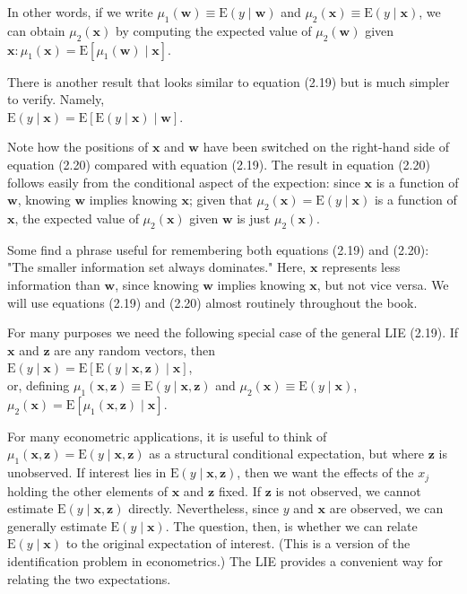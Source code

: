 \documentclass[10pt]{article}
\begin{document}
In other words, if we write $\mu_{1}(\mathbf{w}) \equiv \mathrm{E}(y \mid \mathbf{w})$ and $\mu_{2}(\mathbf{x}) \equiv \mathrm{E}(y \mid \mathbf{x})$, we can obtain $\mu_{2}(\mathbf{x})$ by computing the expected value of $\mu_{2}(\mathbf{w})$ given $\mathbf{x}: \mu_{1}(\mathbf{x})=\mathrm{E}\left[\mu_{1}(\mathbf{w}) \mid \mathbf{x}\right]$.

There is another result that looks similar to equation (2.19) but is much simpler to verify. Namely,\\
$\mathrm{E}(y \mid \mathbf{x})=\mathrm{E}[\mathrm{E}(y \mid \mathbf{x}) \mid \mathbf{w}]$.

Note how the positions of $\mathbf{x}$ and $\mathbf{w}$ have been switched on the right-hand side of equation (2.20) compared with equation (2.19). The result in equation (2.20) follows easily from the conditional aspect of the expection: since $\mathbf{x}$ is a function of $\mathbf{w}$, knowing $\mathbf{w}$ implies knowing $\mathbf{x}$; given that $\mu_{2}(\mathbf{x})=\mathrm{E}(y \mid \mathbf{x})$ is a function of $\mathbf{x}$, the expected value of $\mu_{2}(\mathbf{x})$ given $\mathbf{w}$ is just $\mu_{2}(\mathbf{x})$.

Some find a phrase useful for remembering both equations (2.19) and (2.20): "The smaller information set always dominates." Here, $\mathbf{x}$ represents less information than $\mathbf{w}$, since knowing $\mathbf{w}$ implies knowing $\mathbf{x}$, but not vice versa. We will use equations (2.19) and (2.20) almost routinely throughout the book.

For many purposes we need the following special case of the general LIE (2.19). If $\mathbf{x}$ and $\mathbf{z}$ are any random vectors, then\\
$\mathrm{E}(y \mid \mathbf{x})=\mathrm{E}[\mathrm{E}(y \mid \mathbf{x}, \mathbf{z}) \mid \mathbf{x}]$,\\
or, defining $\mu_{1}(\mathbf{x}, \mathbf{z}) \equiv \mathrm{E}(y \mid \mathbf{x}, \mathbf{z})$ and $\mu_{2}(\mathbf{x}) \equiv \mathrm{E}(y \mid \mathbf{x})$,\\
$\mu_{2}(\mathbf{x})=\mathrm{E}\left[\mu_{1}(\mathbf{x}, \mathbf{z}) \mid \mathbf{x}\right]$.

For many econometric applications, it is useful to think of $\mu_{1}(\mathbf{x}, \mathbf{z})=\mathrm{E}(y \mid \mathbf{x}, \mathbf{z})$ as a structural conditional expectation, but where $\mathbf{z}$ is unobserved. If interest lies in $\mathrm{E}(y \mid \mathbf{x}, \mathbf{z})$, then we want the effects of the $x_{j}$ holding the other elements of $\mathbf{x}$ and $\mathbf{z}$ fixed. If $\mathbf{z}$ is not observed, we cannot estimate $\mathrm{E}(y \mid \mathbf{x}, \mathbf{z})$ directly. Nevertheless, since $y$ and $\mathbf{x}$ are observed, we can generally estimate $\mathrm{E}(y \mid \mathbf{x})$. The question, then, is whether we can relate $\mathrm{E}(y \mid \mathbf{x})$ to the original expectation of interest. (This is a version of the identification problem in econometrics.) The LIE provides a convenient way for relating the two expectations.
\end{document}
